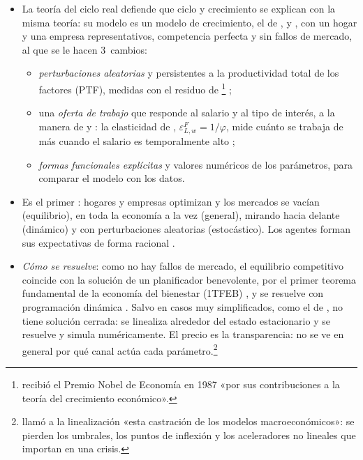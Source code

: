 \documentclass[11pt]{article}
\begin{document}
\begin{itemize}
\item La teoría del ciclo real defiende que ciclo y crecimiento se explican con la misma teoría: su modelo es un modelo de crecimiento, el de ,  y  , con un hogar y una empresa representativos, competencia perfecta y sin fallos de mercado, al que se le hacen 3~cambios\nocite{Romer2019Advanced}:
  \begin{itemize}
  \item \emph{perturbaciones aleatorias} y persistentes a la productividad total de los factores (PTF), medidas con el residuo de \footnote{ recibió el Premio Nobel de Economía en 1987 «por sus contribuciones a la teoría del crecimiento económico»\nocite{Nobel1987Solow}.} ;
  \item una \emph{oferta de trabajo} que responde al salario y al tipo de interés, a la manera de  y : la elasticidad de , $\varepsilon^F_{L,w}=1/\varphi$, mide cuánto se trabaja de más cuando el salario es temporalmente alto ;
  \item \emph{formas funcionales explícitas} y valores numéricos de los parámetros, para comparar el modelo con los datos.
  \end{itemize}
\item Es el primer : hogares y empresas optimizan y los mercados se vacían (equilibrio), en toda la economía a la vez (general), mirando hacia delante (dinámico) y con perturbaciones aleatorias (estocástico)\nocite{Kocherlakota2010Modern}. Los agentes forman sus expectativas de forma racional\nocite{Muth1961Rational} .
\item \emph{Cómo se resuelve}: como no hay fallos de mercado, el equilibrio competitivo coincide con la solución de un planificador benevolente, por el primer teorema fundamental de la economía del bienestar (1TFEB) , y se resuelve con programación dinámica . Salvo en casos muy simplificados, como el de , no tiene solución cerrada: se linealiza alrededor del estado estacionario y se resuelve y simula numéricamente. El precio es la transparencia: no se ve en general por qué canal actúa cada parámetro.\footnote{\textcite{Buiter2009Unfortunate} llamó a la linealización «esta castración de los modelos macroeconómicos»: se pierden los umbrales, los puntos de inflexión y los aceleradores no lineales que importan en una crisis.}
\end{itemize}
\end{document}
